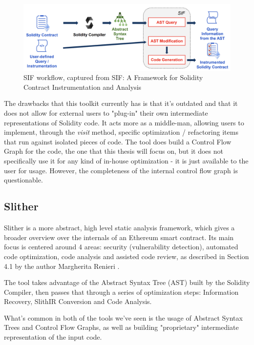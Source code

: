 \begin{figure}
    \centering
    \includegraphics[width=15cm]{images/sif_workflow.png}
    \caption{SIF workflow, captured from SIF: A Framework for Solidity Contract Instrumentation and Analysis \cite{sif}}
    \label{fig:sif-workflow}
\end{figure}

The drawbacks that this toolkit currently has is that it's outdated and that it does not allow for external users to "plug-in" their own intermediate representations of Solidity code. It acts more as a middle-man, allowing users to implement, through the \emph{visit} method, specific optimization / refactoring items that run against isolated pieces of code. The tool does build a Control Flow Graph for the code, the one that this thesis will focus on, but it does not specifically use it for any kind of in-house optimization - it is just available to the user for usage. However, the completeness of the internal control flow graph is questionable.

\subsection{Slither}
\paragraph*{}
Slither is a more abstract, high level static analysis framework, which gives a broader overview over the internals of an Ethereum smart contract. Its main focus is centered around 4 areas: security (vulnerability detection), automated code optimization, code analysis and assisted code review, as described in Section 4.1 by the author Margherita Renieri \cite{slither}.

The tool takes advantage of the Abstract Syntax Tree (AST) built by the Solidity Compiler, then passes that through a series of optimization steps: Information Recovery, SlithIR Conversion and Code Analysis.

What's common in both of the tools we've seen is the usage of Abstract Syntax Trees and Control Flow Graphs, as well as building "proprietary" intermediate representation of the input code.

